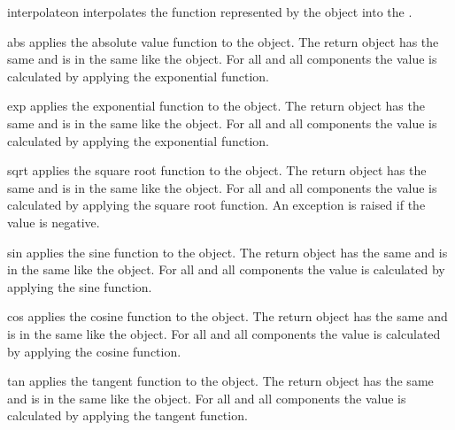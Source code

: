 \begin{methoddesc}[Data]{interpolate}{on}
interpolates 
the function represented by the object
into the \FunctionSpace{}.
\end{methoddesc}

\begin{methoddesc}[Data]{abs}{} 
applies the absolute value function to the object. The
return \Data object has the same \Shape and is in the same
\FunctionSpace like the object. For all \DataSamplePoints and all
components the value is calculated by applying the exponential
function. 
\end{methoddesc}

\begin{methoddesc}[Data]{exp}{} 
applies the exponential function to the object. The
return \Data object has the same \Shape and is in the same
\FunctionSpace like the object. For all \DataSamplePoints and all
components the value is calculated by applying the exponential
function. 
\end{methoddesc}

\begin{methoddesc}[Data]{sqrt}{}
applies the square root function to the object. The
return \Data object has the same \Shape and is in the same
\FunctionSpace like the object. For all \DataSamplePoints and all
components the value is calculated by applying the square root function. 
An exception is
raised if the value is negative.  
\end{methoddesc}

\begin{methoddesc}[Data]{sin}{}
applies the sine function to the object. The
return \Data object has the same \Shape and is in the same
\FunctionSpace like the object. For all \DataSamplePoints and all
components the value is calculated by applying the sine function. 
\end{methoddesc}

\begin{methoddesc}[Data]{cos}{}
applies the cosine function to the object. The
return \Data object has the same \Shape and is in the same
\FunctionSpace like the object. For all \DataSamplePoints and all
components the value is calculated by applying the cosine function. 
\end{methoddesc}

\begin{methoddesc}[Data]{tan}{}
applies the tangent function to the object. The
return \Data object has the same \Shape and is in the same
\FunctionSpace like the object. For all \DataSamplePoints and all
components the value is calculated by applying the tangent function. 
\end{methoddesc}

